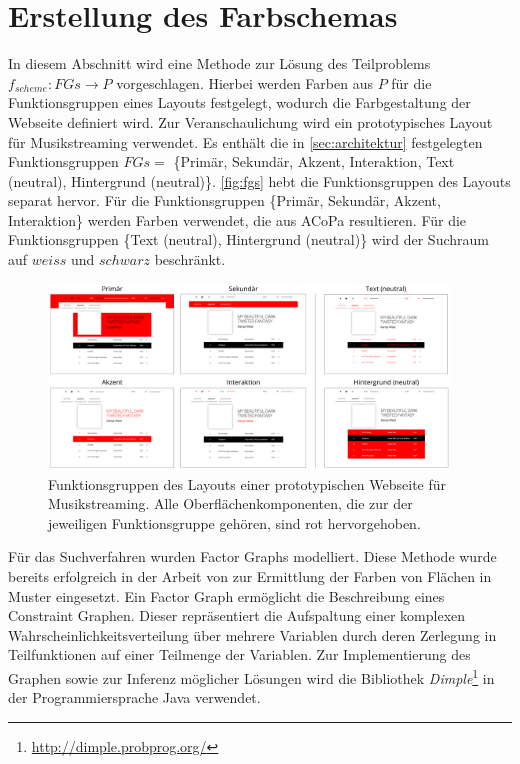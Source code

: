 \section{Erstellung des Farbschemas}
\label{sec:farbschema}

In diesem Abschnitt wird eine Methode zur Lösung des Teilproblems $f_{scheme}: FGs \to P$ vorgeschlagen. Hierbei werden Farben aus $P$ für die Funktionsgruppen eines Layouts festgelegt, wodurch die Farbgestaltung der Webseite definiert wird. Zur Veranschaulichung wird ein prototypisches Layout für Musikstreaming verwendet. Es enthält die in \autoref{sec:architektur} festgelegten Funktionsgruppen $FGs = $ \{Primär, Sekundär, Akzent, Interaktion, Text (neutral), Hintergrund (neutral)\}. \autoref{fig:fgs} hebt die Funktionsgruppen des Layouts separat hervor. Für die Funktionsgruppen \{Primär, Sekundär, Akzent, Interaktion\} werden Farben verwendet, die aus ACoPa resultieren. Für die Funktionsgruppen \{Text (neutral), Hintergrund (neutral)\} wird der Suchraum auf $weiss$ und $schwarz$ beschränkt.

\begin{figure}[]
\centering
\includegraphics[width=0.95\textwidth]{img/fgs.png}
\caption{Funktionsgruppen des Layouts einer prototypischen Webseite für Musikstreaming. Alle Oberflächenkomponenten, die zur der jeweiligen Funktionsgruppe gehören, sind rot hervorgehoben.}
\label{fig:fgs}
\end{figure}

Für das Suchverfahren wurden Factor Graphs modelliert. Diese Methode wurde bereits erfolgreich in der Arbeit von \citet{magazines} zur Ermittlung der Farben von Flächen in Muster eingesetzt. Ein Factor Graph ermöglicht die Beschreibung eines Constraint Graphen. Dieser repräsentiert die Aufspaltung einer komplexen Wahrscheinlichkeitsverteilung über mehrere Variablen durch deren Zerlegung in Teilfunktionen auf einer Teilmenge der Variablen. Zur Implementierung des Graphen sowie zur Inferenz möglicher Lösungen wird die Bibliothek \emph{Dimple}\footnote{\url{http://dimple.probprog.org/}} in der Programmiersprache Java verwendet.

